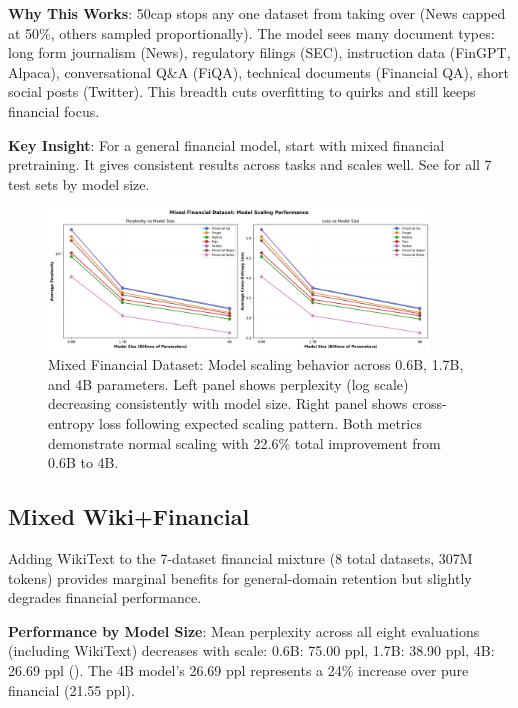\textbf{Why This Works}: 50cap stops any one dataset from taking over (News capped at 50\%, others sampled proportionally). The model sees many document types: long form journalism (News), regulatory filings (SEC), instruction data (FinGPT, Alpaca), conversational Q\&A (FiQA), technical documents (Financial QA), short social posts (Twitter). This breadth cuts overfitting to quirks and still keeps financial focus.

\textbf{Key Insight}: For a general financial model, start with mixed financial pretraining. It gives consistent results across tasks and scales well. See  for all 7 test sets by model size.

\begin{figure}[h]
\centering
\includegraphics[width=0.9\textwidth]{figures/scaling_mixed_financial.png}
\caption[Mixed Financial Dataset: Scaling Behavior]{Mixed Financial Dataset: Model scaling behavior across 0.6B, 1.7B, and 4B parameters. Left panel shows perplexity (log scale) decreasing consistently with model size. Right panel shows cross-entropy loss following expected scaling pattern. Both metrics demonstrate normal scaling with 22.6\% total improvement from 0.6B to 4B.}
\label{fig:scaling_mixed_financial}
\end{figure}



\subsection{Mixed Wiki+Financial}

Adding WikiText to the 7-dataset financial mixture (8 total datasets, 307M tokens) provides marginal benefits for general-domain retention but slightly degrades financial performance.

\textbf{Performance by Model Size}: Mean perplexity across all eight evaluations (including WikiText) decreases with scale: 0.6B: 75.00 ppl, 1.7B: 38.90 ppl, 4B: 26.69 ppl (). The 4B model's 26.69 ppl represents a 24\% increase over pure financial (21.55 ppl).

